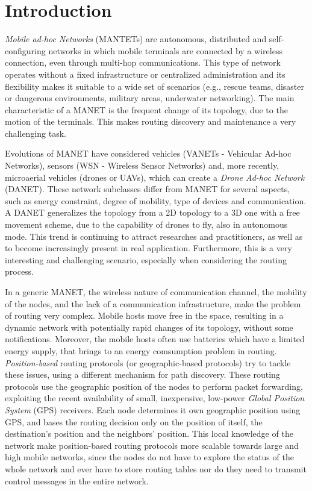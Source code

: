 \documentclass[journal,comsoc]{IEEEtran}
\begin{document}
\section{Introduction}
\emph{Mobile ad-hoc Networks} (MANTETs) are autonomous, distributed and self-configuring networks in which mobile terminals are connected by a wireless connection, even through multi-hop communications. This type of network operates without a fixed infrastructure or centralized administration and its flexibility makes it suitable to a wide set of scenarios (e.g., rescue teams, disaster or dangerous environments, military areas, underwater networking). The main characteristic of a MANET is the frequent change of its topology, due to the motion of the terminals. This makes routing discovery and maintenance a very challenging task. 
\par Evolutions of MANET have considered vehicles (VANETs - Vehicular Ad-hoc Networks), sensors (WSN - Wireless Sensor Networks) and, more recently, microaerial vehicles (drones or UAVs), which can create a \emph{Drone Ad-hoc Network} (DANET). These network subclasses differ from MANET for several aspects, such as energy constraint, degree of mobility, type of devices and communication. A DANET generalizes the topology from a 2D topology to a 3D one with a free movement scheme, due to the capability of drones to fly, also in autonomous mode. This trend is continuing to attract researches and practitioners, as well as to become increasingly present in real application. Furthermore, this is a very interesting and challenging scenario, especially when considering the routing process.
\par In a generic MANET, the wireless nature of communication channel, the mobility of the nodes, and the lack of a communication infrastructure, make the problem of routing very complex. Mobile hosts move free in the space, resulting in a dynamic network with potentially rapid changes of its topology, without some notifications. Moreover, the mobile hosts often use batteries which have a limited energy supply, that brings to an energy comsumption problem in routing. \emph{Position-based} routing protocols (or geographic-based protocols) try to tackle these issues, using a different mechanism for path discovery. These routing protocols use the geographic position of the nodes to perform packet forwarding, exploiting the recent availability of small, inexpensive, low-power \emph{Global Position System} (GPS) receivers. Each node determines it own geographic position using GPS, and bases the routing decision only on the position of itself, the destination's position and the neighbors' position. This local knowledge of the network make position-based routing protocols more scalable towards large and high mobile networks, since the nodes do not have to explore the status of the whole network and ever have to store routing tables nor do they need to transmit control messages in the entire network.
\end{document}
